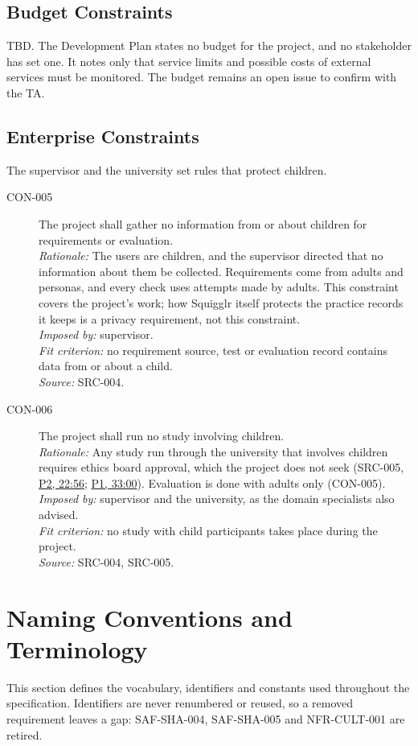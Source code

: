 \documentclass[12pt]{article}
\renewcommand{\_}{\textunderscore\allowbreak}%
\newcommand{\intlink}[3]{\hyperref[int:#1-#2]{#3}}
\newcommand{\intref}[2]{\intlink{#1}{#2}{#1, #2}}
\begin{document}
\subsection{Budget Constraints}
TBD. The Development Plan states no budget for the project, and no stakeholder
has set one. It notes only that service limits and possible costs of external
services must be monitored. The budget remains an open issue to confirm with the
TA.

\subsection{Enterprise Constraints}
The supervisor and the university set rules that protect children.

\begin{description}
\item[CON-005] The project shall gather no information from or about children
for requirements or evaluation.\\
\emph{Rationale:} The users are children, and the supervisor directed that no
information about them be collected. Requirements come from adults and personas,
and every check uses attempts made by adults. This constraint covers the
project's work; how Squigglr itself protects the practice records it keeps is a
privacy requirement, not this constraint.\\
\emph{Imposed by:} supervisor.\\
\emph{Fit criterion:} no requirement source, test or evaluation record contains
data from or about a child.\\
\emph{Source:} SRC-004.
\item[CON-006] The project shall run no study involving children.\\
\emph{Rationale:} Any study run through the university that involves children
requires ethics board approval, which the project does not seek (SRC-005,
\intref{P2}{22:56}; \intref{P1}{33:00}). Evaluation is done with adults only
(CON-005).\\
\emph{Imposed by:} supervisor and the university, as the domain specialists also
advised.\\
\emph{Fit criterion:} no study with child participants takes place during the
project.\\
\emph{Source:} SRC-004, SRC-005.
\end{description}

\section{Naming Conventions and Terminology}
\label{sec:terminology}
This section defines the vocabulary, identifiers and constants used throughout
the specification. Identifiers are never renumbered or reused, so a removed
requirement leaves a gap: SAF-SHA-004, SAF-SHA-005 and NFR-CULT-001 are retired.
\end{document}
